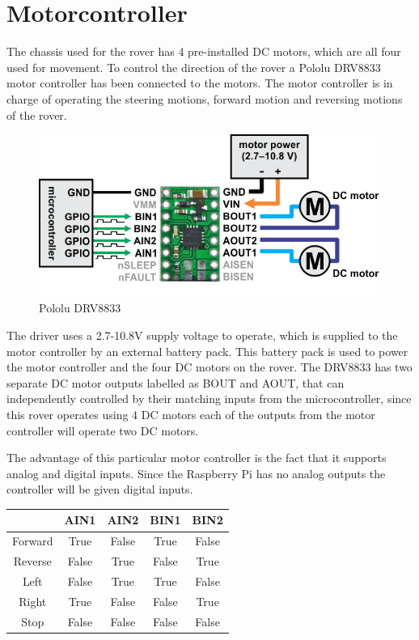 \clearpage
\section{Motorcontroller}

The chassis used for the rover has 4 pre-installed DC motors, which are all four used for movement. To control the direction of the rover a Pololu DRV8833 motor controller has been connected to the motors. The motor controller is in charge of operating the steering motions, forward motion and reversing motions of the rover.

\begin{figure}[H]
	\centering
	\includegraphics[width=.8\linewidth]{images/DRV8833.png}
	\caption{Pololu DRV8833\cite{DRV8833pic}}
\end{figure}

The driver uses a 2.7-10.8V supply voltage to operate, which is supplied to the motor controller by an external battery pack. This battery pack is used to power the motor controller and the four DC motors on the rover. The DRV8833 has two separate DC motor outputs labelled as BOUT and AOUT, that can independently controlled by their matching inputs from the microcontroller, since this rover operates using 4 DC motors each of the outputs from the motor controller will operate two DC motors.

The advantage of this particular motor controller is the fact that it supports analog and digital inputs. Since the Raspberry Pi has no analog outputs the controller will be given digital inputs. 

\begin{table}[H]
\centering
\begin{tabular}{c|c|c|c|c|}
\cline{2-5}
                              & AIN1  & AIN2  & BIN1  & BIN2  \\ \hline
\multicolumn{1}{|c|}{Forward} & True  & False & True  & False \\ \hline
\multicolumn{1}{|c|}{Reverse} & False & True  & False & True  \\ \hline
\multicolumn{1}{|c|}{Left}    & False & True  & True  & False \\ \hline
\multicolumn{1}{|c|}{Right}   & True  & False & False & True  \\ \hline
\multicolumn{1}{|c|}{Stop}    & False & False & False & False \\ \hline
\end{tabular}
\end{table}

